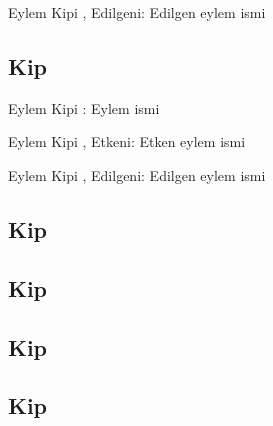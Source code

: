 \begin{eylemkipi}{Eylem Kipi , Edilgeni: }
  Edilgen eylem ismi
\end{eylemkipi}



\subsection*{Kip }

\begin{eylemkipi}{Eylem Kipi : }
  Eylem ismi
\end{eylemkipi}

\begin{eylemkipi}{Eylem Kipi , Etkeni: }
  Etken eylem ismi
\end{eylemkipi}

\begin{eylemkipi}{Eylem Kipi , Edilgeni: }
  Edilgen eylem ismi
\end{eylemkipi}


\subsection*{Kip }


\subsection*{Kip }


\subsection*{Kip }


\subsection*{Kip }

